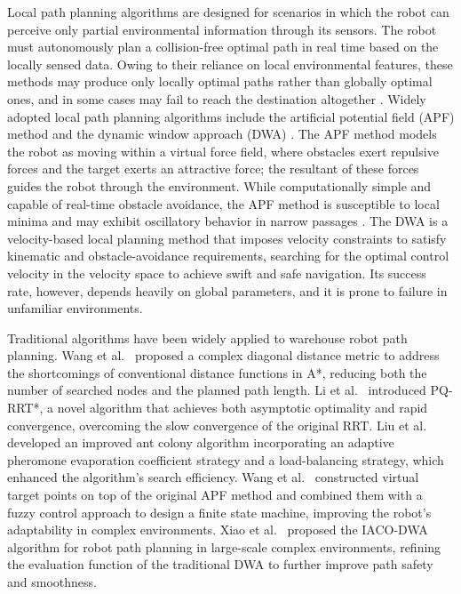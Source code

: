 Local path planning algorithms are designed for scenarios in which the robot can perceive only partial environmental information through its sensors. The robot must autonomously plan a collision-free optimal path in real time based on the locally sensed data. Owing to their reliance on local environmental features, these methods may produce only locally optimal paths rather than globally optimal ones, and in some cases may fail to reach the destination altogether \cite{ref6}. Widely adopted local path planning algorithms include the artificial potential field (APF) method \cite{ref7} and the dynamic window approach (DWA) \cite{ref8}. The APF method models the robot as moving within a virtual force field, where obstacles exert repulsive forces and the target exerts an attractive force; the resultant of these forces guides the robot through the environment. While computationally simple and capable of real-time obstacle avoidance, the APF method is susceptible to local minima and may exhibit oscillatory behavior in narrow passages \cite{ref9}. The DWA is a velocity-based local planning method that imposes velocity constraints to satisfy kinematic and obstacle-avoidance requirements, searching for the optimal control velocity in the velocity space to achieve swift and safe navigation. Its success rate, however, depends heavily on global parameters, and it is prone to failure in unfamiliar environments.

Traditional algorithms have been widely applied to warehouse robot path planning. Wang et al.\ \cite{ref10} proposed a complex diagonal distance metric to address the shortcomings of conventional distance functions in A*, reducing both the number of searched nodes and the planned path length. Li et al.\ \cite{ref11} introduced PQ-RRT*, a novel algorithm that achieves both asymptotic optimality and rapid convergence, overcoming the slow convergence of the original RRT. Liu et al.\ \cite{ref12} developed an improved ant colony algorithm incorporating an adaptive pheromone evaporation coefficient strategy and a load-balancing strategy, which enhanced the algorithm's search efficiency. Wang et al.\ \cite{ref13} constructed virtual target points on top of the original APF method and combined them with a fuzzy control approach to design a finite state machine, improving the robot's adaptability in complex environments. Xiao et al.\ \cite{ref14} proposed the IACO-DWA algorithm for robot path planning in large-scale complex environments, refining the evaluation function of the traditional DWA to further improve path safety and smoothness.

